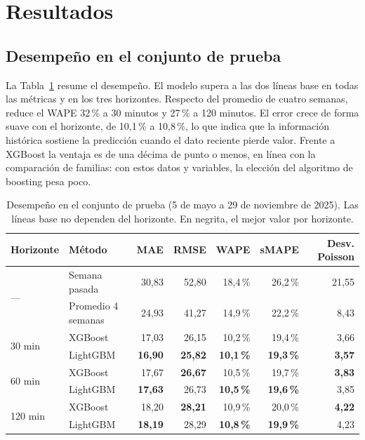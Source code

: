 \documentclass[11pt,a4paper]{article}
\begin{document}
\section{Resultados}

\subsection{Desempeño en el conjunto de prueba}

La Tabla~\ref{tab:resultados} resume el desempeño. El modelo supera a las dos líneas base en todas las métricas y en los tres horizontes. Respecto del promedio de cuatro semanas, reduce el WAPE 32\,\% a 30 minutos y 27\,\% a 120 minutos. El error crece de forma suave con el horizonte, de 10,1\,\% a 10,8\,\%, lo que indica que la información histórica sostiene la predicción cuando el dato reciente pierde valor. Frente a XGBoost la ventaja es de una décima de punto o menos, en línea con la comparación de familias: con estos datos y variables, la elección del algoritmo de boosting pesa poco.

\begin{table}[H]
  \centering
  \caption{Desempeño en el conjunto de prueba (5 de mayo a 29 de noviembre de 2025). Las líneas base no dependen del horizonte. En negrita, el mejor valor por horizonte.}
  \label{tab:resultados}
  \small
  \begin{tabular}{llrrrrr}
    \toprule
    Horizonte & Método & MAE & RMSE & WAPE & sMAPE & Desv. Poisson \\
    \midrule
    \multirow{2}{*}{---}
      & Semana pasada      & 30,83 & 52,80 & 18,4\,\% & 26,2\,\% & 21,55 \\
      & Promedio 4 semanas & 24,93 & 41,27 & 14,9\,\% & 22,2\,\% & 8,43 \\
    \midrule
    \multirow{2}{*}{30 min}
      & XGBoost  & 17,03 & 26,15 & 10,2\,\% & 19,4\,\% & 3,66 \\
      & LightGBM & \textbf{16,90} & \textbf{25,82} & \textbf{10,1\,\%} & \textbf{19,3\,\%} & \textbf{3,57} \\
    \midrule
    \multirow{2}{*}{60 min}
      & XGBoost  & 17,67 & \textbf{26,67} & 10,5\,\% & 19,7\,\% & \textbf{3,83} \\
      & LightGBM & \textbf{17,63} & 26,73 & \textbf{10,5\,\%} & \textbf{19,6\,\%} & 3,85 \\
    \midrule
    \multirow{2}{*}{120 min}
      & XGBoost  & 18,20 & \textbf{28,21} & 10,9\,\% & 20,0\,\% & \textbf{4,22} \\
      & LightGBM & \textbf{18,19} & 28,29 & \textbf{10,8\,\%} & \textbf{19,9\,\%} & 4,23 \\
    \bottomrule
  \end{tabular}
\end{table}
\end{document}
